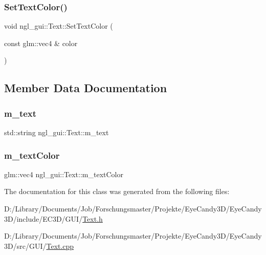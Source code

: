 \mbox{\label{classngl__gui_1_1_text_a25b6ad0a6f6b678c0851bed62479d571}} 
\subsubsection{\texorpdfstring{Set\+Text\+Color()}{SetTextColor()}}
{\footnotesize\ttfamily void ngl\+\_\+gui\+::\+Text\+::\+Set\+Text\+Color (\begin{DoxyParamCaption}\item[{const glm\+::vec4 \&}]{color }\end{DoxyParamCaption})}



\subsection{Member Data Documentation}
\mbox{\label{classngl__gui_1_1_text_a6a790da1212181a8dd95d6c5152a1699}} 
\subsubsection{\texorpdfstring{m\+\_\+text}{m\_text}}
{\footnotesize\ttfamily std\+::string ngl\+\_\+gui\+::\+Text\+::m\+\_\+text\hspace{0.3cm}{\ttfamily [protected]}}

\mbox{\label{classngl__gui_1_1_text_a5af39c39464b4528cf8c38edea008daf}} 
\subsubsection{\texorpdfstring{m\+\_\+text\+Color}{m\_textColor}}
{\footnotesize\ttfamily glm\+::vec4 ngl\+\_\+gui\+::\+Text\+::m\+\_\+text\+Color\hspace{0.3cm}{\ttfamily [protected]}}



The documentation for this class was generated from the following files\+:\begin{DoxyCompactItemize}
\item 
D\+:/\+Library/\+Documents/\+Job/\+Forschungsmaster/\+Projekte/\+Eye\+Candy3\+D/\+Eye\+Candy3\+D/include/\+E\+C3\+D/\+G\+U\+I/\mbox{\hyperlink{_text_8h}{Text.\+h}}\item 
D\+:/\+Library/\+Documents/\+Job/\+Forschungsmaster/\+Projekte/\+Eye\+Candy3\+D/\+Eye\+Candy3\+D/src/\+G\+U\+I/\mbox{\hyperlink{_text_8cpp}{Text.\+cpp}}\end{DoxyCompactItemize}
